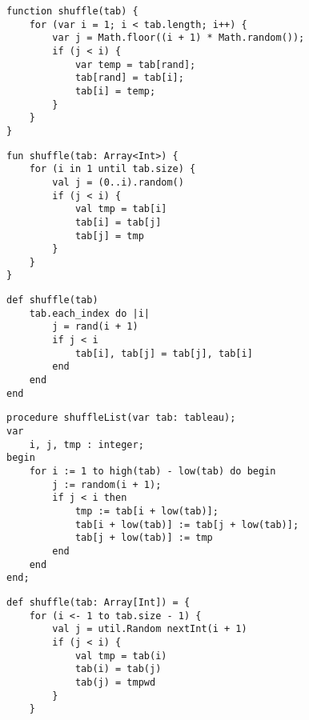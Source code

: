 \documentclass[a4paper,12pt]{book}
\begin{document}
\begin{encadre}
\begin{verbatim}
function shuffle(tab) {
    for (var i = 1; i < tab.length; i++) {
        var j = Math.floor((i + 1) * Math.random());
        if (j < i) {
            var temp = tab[rand];
            tab[rand] = tab[i];
            tab[i] = temp;
        }
    }
}
\end{verbatim}
\end{encadre}

\begin{encadre}
\begin{verbatim}
fun shuffle(tab: Array<Int>) {
    for (i in 1 until tab.size) {
        val j = (0..i).random()
        if (j < i) {
            val tmp = tab[i]
            tab[i] = tab[j]
            tab[j] = tmp
        }
    }
}
\end{verbatim}
\end{encadre}

\begin{encadre}
\begin{verbatim}
def shuffle(tab)
    tab.each_index do |i|
        j = rand(i + 1)
        if j < i
            tab[i], tab[j] = tab[j], tab[i]
        end
    end
end
\end{verbatim}
\end{encadre}

\begin{encadre}
\begin{verbatim}
procedure shuffleList(var tab: tableau);
var
    i, j, tmp : integer;
begin
    for i := 1 to high(tab) - low(tab) do begin
        j := random(i + 1);
        if j < i then
            tmp := tab[i + low(tab)];
            tab[i + low(tab)] := tab[j + low(tab)];
            tab[j + low(tab)] := tmp
        end
    end
end;
\end{verbatim}
\end{encadre}

\begin{encadre}
\begin{verbatim}
def shuffle(tab: Array[Int]) = {
    for (i <- 1 to tab.size - 1) {
        val j = util.Random nextInt(i + 1)
        if (j < i) {
            val tmp = tab(i)
            tab(i) = tab(j)
            tab(j) = tmpwd
        }
    }
\end{verbatim}
\end{encadre}
\end{document}
